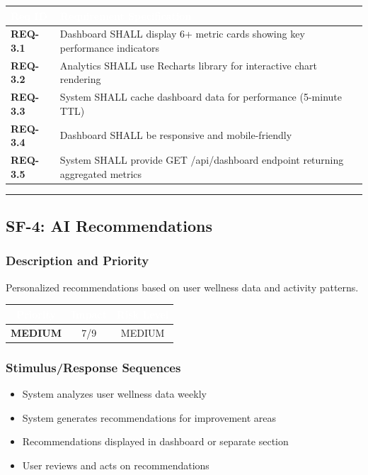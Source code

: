 \documentclass[12pt,a4paper]{article}
\begin{document}
\vspace{0.3em}
\begin{center}
\begin{tabular}{|l|p{11cm}|}
\hline
\rowcolor{deepblue}
\textcolor{white}{\textbf{Req ID}} & \textcolor{white}{\textbf{Requirement Specification}} \\
\hline
\rowcolor{lightgray}
\textbf{REQ-3.1} & Dashboard SHALL display 6+ metric cards showing key performance indicators \\
\hline
\textbf{REQ-3.2} & Analytics SHALL use Recharts library for interactive chart rendering \\
\hline
\rowcolor{lightgray}
\textbf{REQ-3.3} & System SHALL cache dashboard data for performance (5-minute TTL) \\
\hline
\textbf{REQ-3.4} & Dashboard SHALL be responsive and mobile-friendly \\
\hline
\rowcolor{lightgray}
\textbf{REQ-3.5} & System SHALL provide GET /api/dashboard endpoint returning aggregated metrics \\
\hline
\end{tabular}
\end{center}

\vspace{1em}
\hrule

\subsection{SF-4: AI Recommendations}

\subsubsection{Description and Priority}
Personalized recommendations based on user wellness data and activity patterns.

\vspace{0.3em}
\begin{center}
\begin{tabular}{|c|c|c|}
\hline
\rowcolor{accentblue}
\textcolor{white}{\textbf{Priority}} & \textcolor{white}{\textbf{Impact}} & \textcolor{white}{\textbf{Risk Level}} \\
\hline
\rowcolor{lightgray}
\textbf{\textcolor{accentblue}{MEDIUM}} & 7/9 & MEDIUM \\
\hline
\end{tabular}
\end{center}

\subsubsection{Stimulus/Response Sequences}
\begin{itemize}
    \item System analyzes user wellness data weekly
    \item System generates recommendations for improvement areas
    \item Recommendations displayed in dashboard or separate section
    \item User reviews and acts on recommendations
\end{itemize}
\end{document}
